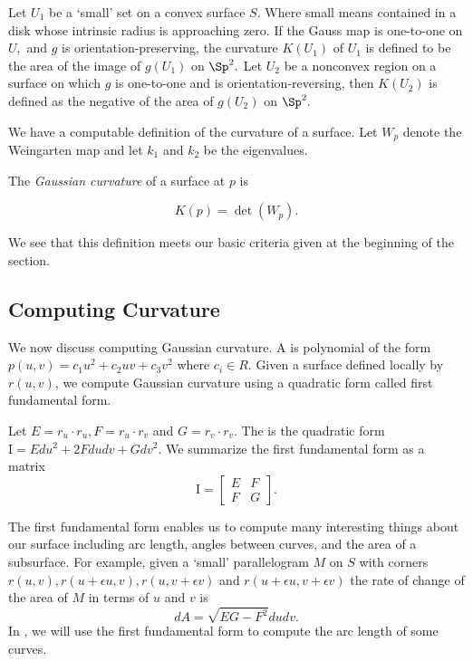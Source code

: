Let $U_1$ be a `small' set on a convex surface $S$. Where small means
contained in a disk whose intrinsic radius is approaching zero.
If the Gauss map is one-to-one on $U,$ and $g$ is orientation-preserving,
the curvature $K(U_1)$ of $U_1$ is defined to be the area of the image of $g(U_1)$
on $\Sp^2.$
Let $U_2$ be a nonconvex region on a surface on which $g$ is one-to-one and is orientation-reversing,
then $K(U_2)$ is defined as the negative of the area of $g(U_2)$ on $\Sp^2.$



We have a computable definition of the curvature of a surface. Let $W_p$ denote
the Weingarten map and let $k_1$ and $k_2$ be the eigenvalues.
\begin{definition}
The \emph{Gaussian curvature} of a surface at \(p\) is

$$K(p)=\det(W_p).$$

\end{definition}
\noindent We see that this definition meets our basic criteria given at the beginning of the section.







\subsection{Computing Curvature}
We now discuss computing Gaussian curvature.
A  is polynomial 
of the form $p(u,v)=c_1u^2+c_2uv+c_3v^2$ 
where $c_i\in R$.
Given a surface defined locally by $r(u,v)$,
we compute Gaussian curvature using a quadratic form called first fundamental form.

Let $E=r_u\cdot r_u, F=r_u\cdot r_v$ and  $G=r_v\cdot r_v$.
The 
is the quadratic form $\mathrm{I}=Edu^2+2Fdudv +Gdv^2$.
We summarize the first fundamental form as a matrix $$\mathrm{I}=\begin{bmatrix}
E & F \\
F & G 
\end{bmatrix}.$$

The first fundamental form enables us to  compute many interesting
things about our surface including arc length, angles between curves,
and the area of a subsurface.
For example,
given a `small' parallelogram $M$ on $S$ with corners $r(u,v),r(u+\epsilon u, v), r(u,v+\epsilon v)$ 
and $r(u+\epsilon u, v+\epsilon v)$ the rate of change of the area of $M$ in terms of $u$ and $v$ is 
$$dA=\sqrt{EG-F^2}dudv.$$
In , we will use the first fundamental form to compute the arc length of some curves.

